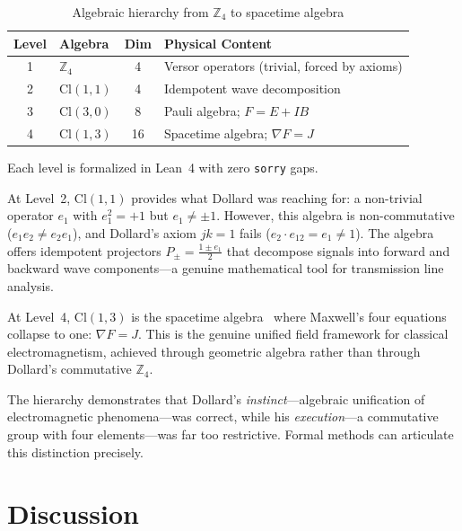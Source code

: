 \documentclass[runningheads]{llncs}
\begin{document}
\begin{table}[ht]
\centering
\caption{Algebraic hierarchy from $\mathbb{Z}_4$ to spacetime algebra}
\label{tab:hierarchy}
\begin{tabular}{@{}clcl@{}}
\toprule
\textbf{Level} & \textbf{Algebra} & \textbf{Dim} & \textbf{Physical Content} \\
\midrule
1 & $\mathbb{Z}_4$ & 4 & Versor operators (trivial, forced by axioms) \\
2 & $\mathrm{Cl}(1,1)$ & 4 & Idempotent wave decomposition \\
3 & $\mathrm{Cl}(3,0)$ & 8 & Pauli algebra; $F = E + IB$ \\
4 & $\mathrm{Cl}(1,3)$ & 16 & Spacetime algebra; $\nabla F = J$ \\
\bottomrule
\end{tabular}
\end{table}

Each level is formalized in Lean~4 with zero \texttt{sorry} gaps.

At Level~2, $\mathrm{Cl}(1,1)$ provides what Dollard was reaching for: a
non-trivial operator $e_1$ with $e_1^2 = +1$ but $e_1 \neq \pm 1$. However,
this algebra is non-commutative ($e_1 e_2 \neq e_2 e_1$), and Dollard's axiom
$jk = 1$ fails ($e_2 \cdot e_{12} = e_1 \neq 1$). The algebra offers idempotent
projectors $P_{\pm} = \frac{1 \pm e_1}{2}$ that decompose signals into
forward and backward wave components---a genuine mathematical tool for
transmission line analysis.

At Level~4, $\mathrm{Cl}(1,3)$ is the spacetime algebra~\cite{hestenes1966,doran2003}
where Maxwell's four equations collapse to one: $\nabla F = J$. This is the genuine unified field
framework for classical electromagnetism, achieved through geometric algebra
rather than through Dollard's commutative $\mathbb{Z}_4$.

The hierarchy demonstrates that Dollard's \emph{instinct}---algebraic
unification of electromagnetic phenomena---was correct, while his
\emph{execution}---a commutative group with four elements---was far too
restrictive. Formal methods can articulate this distinction precisely.

\section{Discussion}
\label{sec:discussion}
\end{document}
